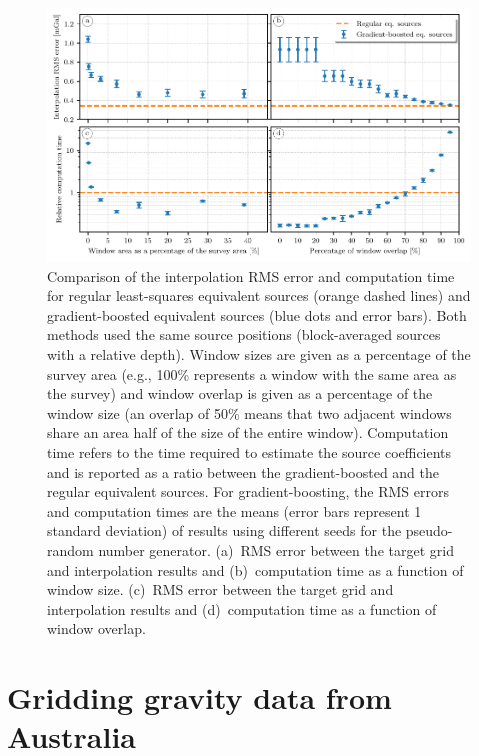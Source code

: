 \documentclass[twocolumn]{article}
\begin{document}
\begin{figure}
    \includegraphics[width=\linewidth]{figs/gradient-boosted-comparisons.pdf}
    \caption{
        Comparison of the interpolation RMS error and computation time for
        regular least-squares equivalent sources (orange dashed lines) and
        gradient-boosted equivalent sources (blue dots and error bars).
        Both methods used the same source positions (block-averaged sources
        with a relative depth).
        Window sizes are given as a percentage of the survey area (e.g., 100\%
        represents a window with the same area as the survey) and window
        overlap is given as a percentage of the window size
        (an overlap of 50\% means that two adjacent windows
        share an area half of the size of the entire window).
        Computation time refers to the time required to estimate the source
        coefficients and is reported as a ratio between the gradient-boosted
        and the regular equivalent sources.
        For gradient-boosting, the RMS errors and computation times are the
        means (error bars represent 1 standard deviation) of results using
        different seeds for the pseudo-random number generator.
        (a)~RMS error between the target grid and interpolation results and
        (b)~computation time as a function of window size.
        (c)~RMS error between the target grid and interpolation results and
        (d)~computation time as a function of window overlap.
}
    \label{fig:gradient-boosted-comparison}
\end{figure}



\section{Gridding gravity data from Australia}
\end{document}
